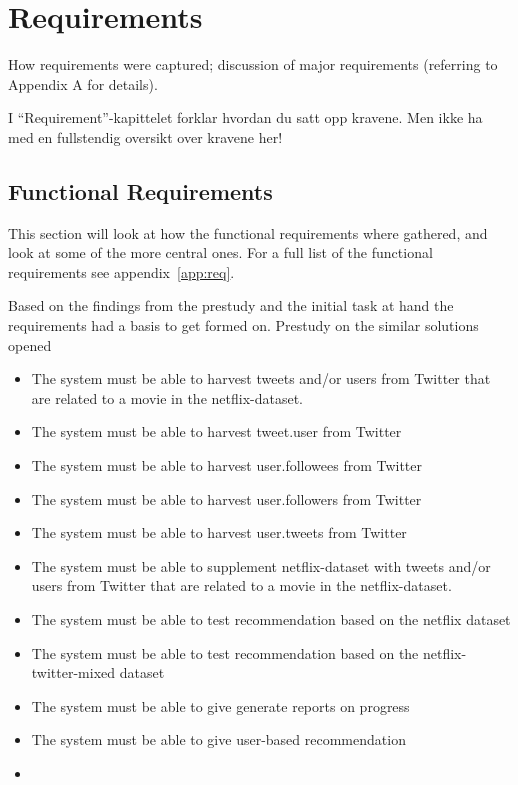 
\chapter{Requirements}

\minitoc

How requirements  were  captured;
  discussion  of  major requirements
(referring  to  Appendix  A for details).

I “Requirement”-kapittelet forklar hvordan du satt opp kravene.
Men ikke ha med en fullstendig oversikt over kravene her!


\clearpage

\section{Functional Requirements}
This section will look at how the functional requirements where gathered, and look at some of the more central ones. For a full list of the functional requirements see appendix~\ref{app:req}.

Based on the findings from the prestudy and the initial task at hand the requirements had a basis to get formed on. Prestudy on the similar solutions opened

\begin{itemize}
  \item The system must be able to harvest tweets and/or users from Twitter that are related to a movie in the netflix-dataset.
  \item The system must be able to harvest tweet.user from Twitter
  \item The system must be able to harvest user.followees from Twitter
  \item The system must be able to harvest user.followers from Twitter
  \item The system must be able to harvest user.tweets from Twitter

  \item The system must be able to supplement netflix-dataset with tweets and/or users from Twitter that are related to a movie in the netflix-dataset.
  \item The system must be able to test recommendation based on the netflix dataset
  \item The system must be able to test recommendation based on the netflix-twitter-mixed dataset
  \item The system must be able to give generate reports on progress
  \item The system must be able to give user-based recommendation
  \item
\end{itemize}

